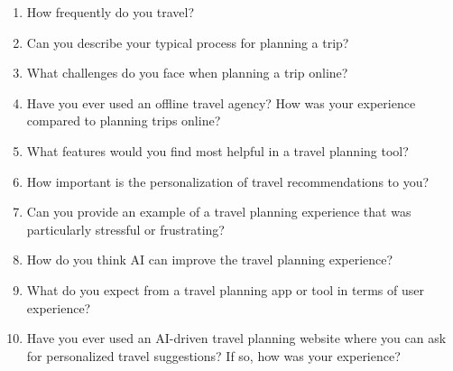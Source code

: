 \documentclass[conference]{IEEEtran}
\begin{document}
    \begin{enumerate}
        \item How frequently do you travel?
        \item Can you describe your typical process for planning a trip?
        \item What challenges do you face when planning a trip online?
        \item Have you ever used an offline travel agency? How was your experience compared to planning trips online?
        \item What features would you find most helpful in a travel planning tool?
        \item How important is the personalization of travel recommendations to you?
        \item Can you provide an example of a travel planning experience that was particularly stressful or frustrating?
        \item How do you think AI can improve the travel planning experience?
        \item What do you expect from a travel planning app or tool in terms of user experience?
        \item Have you ever used an AI-driven travel planning website where you can ask for personalized travel suggestions? If so, how was your experience?
    \end{enumerate}
\end{document}
